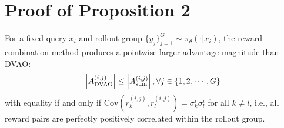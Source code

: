 \documentclass{llmxive}
\providecommand{\Cov}{\mathrm{Cov}}
\begin{document}
\section{Proof of Proposition 2}
\label{appendix:proof_of_proposition_2}


\begin{proposition}
    For a fixed query $x_i$ and rollout group $\{y_j\}_{j=1}^G \sim \pi_\theta(\cdot | x_i)$, the reward combination method produces a pointwise larger advantage magnitude than DVAO:
    \begin{align}
        \left| A_\text{DVAO}^{(i,j)} \right| \le \left| A_\text{sum}^{(i,j)} \right|, \forall j \in \{1, 2, \cdots, G\} \notag
    \end{align}
    with equality if and only if $\Cov\left(r_k^{(i,j)}, r_l^{(i,j)}\right) = \sigma_k^i \sigma_l^i$ for all $k \neq l$, i.e., all reward pairs are perfectly positively correlated within the rollout group.
\end{proposition}
\end{document}

